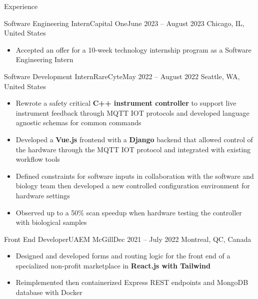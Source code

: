 \documentclass[]{mcdowellcv}
\begin{document}
\begin{cvsection}{Experience}
	\begin{cvsubsection}{Software Engineering Intern}{Capital One}{June 2023 -- August 2023}
		\vspace{-2.5mm}
		Chicago, IL, United States
		\begin{itemize}%
			\item Accepted an offer for a 10-week technology internship program as a Software Engineering Intern
		\end{itemize}
	\end{cvsubsection}
	\begin{cvsubsection}{Software Development Intern}{RareCyte}{May 2022 -- August 2022}
		Seattle, WA, United States
		\begin{itemize}%
			\item Rewrote a safety critical \textbf{C++ instrument controller} to support live instrument feedback through MQTT IOT protocols and developed language agnostic schemas for common commands
			\item Developed a \textbf{Vue.js} frontend with a \textbf{Django} backend that allowed control of the hardware through the MQTT IOT protocol and integrated with existing workflow tools
			\item Defined constraints for software inputs in collaboration with the software and biology team then developed a new controlled configuration environment for hardware settings
			\item Observed up to a 50\% scan speedup when hardware testing the controller with biological samples
		\end{itemize}
	\end{cvsubsection}
	\begin{cvsubsection}{Front End Developer}{UAEM McGill}{Dec 2021 -- July 2022}
		\vspace{-2.5mm}
		Montreal, QC, Canada
		\begin{itemize}%
			\item Designed and developed forms and routing logic for the front end of a specialized non-profit marketplace in \textbf{React.js with Tailwind}
			\item Reimplemented then containerized Express REST endpoints and MongoDB database with Docker
		\end{itemize}
	\end{cvsubsection}

\end{cvsection}
\end{document}
